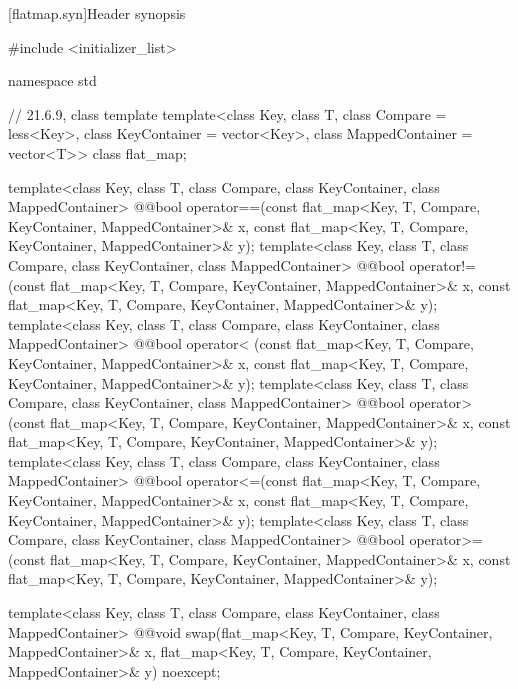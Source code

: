 \setcounter{chapter}{21}
\setcounter{section}{6}
\setcounter{subsection}{3}
[flatmap.syn]{Header  synopsis}%
%

\begin{codeblock}
#include <initializer_list>

namespace std {
  // 21.6.9, class template 
  template<class Key, class T, class Compare = less<Key>,
           class KeyContainer = vector<Key>, class MappedContainer = vector<T>>
    class flat_map;

  template<class Key, class T, class Compare,
           class KeyContainer, class MappedContainer>
    @@bool
    operator==(const flat_map<Key, T, Compare, KeyContainer, MappedContainer>& x,
               const flat_map<Key, T, Compare, KeyContainer, MappedContainer>& y);
  template<class Key, class T, class Compare,
           class KeyContainer, class MappedContainer>
    @@bool
    operator!=(const flat_map<Key, T, Compare, KeyContainer, MappedContainer>& x,
               const flat_map<Key, T, Compare, KeyContainer, MappedContainer>& y);
  template<class Key, class T, class Compare,
           class KeyContainer, class MappedContainer>
    @@bool
    operator< (const flat_map<Key, T, Compare, KeyContainer, MappedContainer>& x,
               const flat_map<Key, T, Compare, KeyContainer, MappedContainer>& y);
  template<class Key, class T, class Compare,
           class KeyContainer, class MappedContainer>
    @@bool
    operator> (const flat_map<Key, T, Compare, KeyContainer, MappedContainer>& x,
               const flat_map<Key, T, Compare, KeyContainer, MappedContainer>& y);
  template<class Key, class T, class Compare,
           class KeyContainer, class MappedContainer>
    @@bool
    operator<=(const flat_map<Key, T, Compare, KeyContainer, MappedContainer>& x,
               const flat_map<Key, T, Compare, KeyContainer, MappedContainer>& y);
  template<class Key, class T, class Compare,
           class KeyContainer, class MappedContainer>
    @@bool
    operator>=(const flat_map<Key, T, Compare, KeyContainer, MappedContainer>& x,
               const flat_map<Key, T, Compare, KeyContainer, MappedContainer>& y);

  template<class Key, class T, class Compare,
           class KeyContainer, class MappedContainer>
    @@void
    swap(flat_map<Key, T, Compare, KeyContainer, MappedContainer>& x,
         flat_map<Key, T, Compare, KeyContainer, MappedContainer>& y) noexcept;

}
\end{codeblock}
